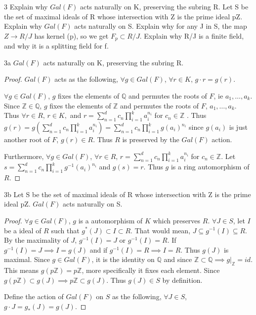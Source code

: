 \documentclass{article}
\newcommand{\Q}{\mathbb{Q}}
\newcommand{\Z}{\mathbb{Z}}
\begin{document}
\bigskip

\begin{PROB}{3}\label{Problem 3.}
    Explain why $Gal(F)$ acts naturally on K, preserving the subring R. Let S be the set of maximal ideals of R whose intersection with Z is the prime ideal pZ. Explain why $Gal(F)$ acts naturally on S. Explain why for any J in S, the map $Z \to R/J$ has kernel (p),  so we get $F_p \subset R/J$. Explain why  R/J is a finite field, and why it is a splitting field for f.
\end{PROB}
\begin{claim}{3a}\label{Claim 3a.}
    $Gal(F)$ acts naturally on K, preserving the subring R.
\end{claim}
\begin{proof}
    $Gal(F)$ acts as the following, $\forall g \in Gal(F)$, $\forall r \in K$, $g \cdot r = g(r)$.  

    $\forall g \in Gal(F)$, $g$ fixes the elements of $\Q$ and permutes the roots of $F$, ie $a_1, \dots, a_k$. Since $\Z \in \Q$, $g$ fixes the elements of $\Z$ and permutes the roots of $F$, $a_1, \dots, a_k$. Thus $\forall r \in R$, $r \in K, $ and $r = \sum_{n = 1}^{d} c_n \prod_{i = 1}^{k} a_i^{n_i}$ for $c_n \in \Z$ . Thus $g(r) = g(\sum_{n = 1}^{d} c_n \prod_{i = 1}^{k} a_i^{n_i}) = \sum_{n = 1}^{d} c_n \prod_{i = 1}^{k} g(a_i)^{n_i}$ since $g(a_i)$ is just another root of $F$, $g(r) \in R$. Thus $R$ is preserved by the $Gal(F)$ action.
    
    Furthermore, $\forall g \in Gal(F)$,  $\forall r \in R$, $r = \sum_{n = 1}^{d} c_n \prod_{i = 1}^{k} a_i^{n_i}$ for $c_n \in \Z$. Let $s = \sum_{n = 1}^{d} c_n \prod_{i = 1}^{k} g^{-1}(a_i)^{n_i}$ and $g(s) = r$. Thus $g$ is a ring automorphism of $R$.        
\end{proof}
\begin{claim}{3b}\label{Claim 3b.}
    Let S be the set of maximal ideals of R whose intersection with Z is the prime ideal pZ. $Gal(F)$ acts naturally on S.
\end{claim}
\begin{proof}
    $\forall g \in Gal(F)$, $g$ is a automorphism of $K$ which preserves $R$. $\forall J \in S$, let $I$ be a ideal of $R$ such that $g^*(J) \subset I \subset R$. That would mean, $J \subseteq g^{-1}(I) \subseteq R$. By the maximality of $J$, $g^{-1}(I) = J$ or $g^{-1}(I) = R$. If $g^{-1}(I) = J \implies I = g(J)$ and if $g^{-1}(I) =R \implies I = R$. Thus $g(J)$ is maximal. Since $g \in Gal(F)$, it is the identity on $\Q$ and since $\Z \subset \Q \implies g|_{\Z} = id$. This means $g(p\Z) = p\Z$, more specifically it fixes each element. Since $g(p\Z) \subset g(J) \implies p\Z \subset g(J)$. Thus $g(J) \in S$ by definition.          

    Define the action of $Gal(F)$ on $S$ as the following, $\forall J \in S$, $g \cdot J = g_*(J) = g(J)$. 
\end{proof}
\end{document}
